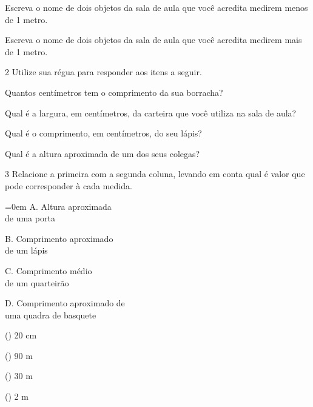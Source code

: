 \begin{escolha}
\item Escreva o nome de dois objetos da sala de aula que você acredita
  medirem menos de 1 metro.\\

\item Escreva o nome de dois objetos da sala de aula que você acredita
  medirem mais de 1 metro.\\
\end{escolha}

\num{2} Utilize sua régua para responder aos itens a seguir.

\begin{escolha}
\item Quantos centímetros tem o comprimento da sua borracha?\\

\item Qual é a largura, em centímetros, da carteira que você utiliza na sala de aula?\\

\item Qual é o comprimento, em centímetros, do seu lápis?\\

\item Qual é a altura aproximada de um dos seus colegas?\\
\end{escolha}

\num{3} Relacione a primeira com a segunda coluna, levando em conta qual é valor que 
pode corresponder à cada medida.


\begin{multicols}{2}\parindent=0em
A. Altura aproximada\\
de uma porta\bigskip

B. Comprimento aproximado\\
de um lápis\bigskip

C. Comprimento médio\\
de um quarteirão\bigskip

D. Comprimento aproximado de\\
uma quadra de basquete

\columnbreak

(\hspace{2em}) 20 cm\bigskip

(\hspace{2em}) 90 m\bigskip

(\hspace{2em}) 30 m\bigskip

(\hspace{2em}) 2 m
\end{multicols}


